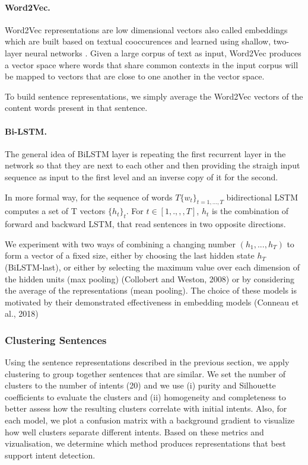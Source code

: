 \documentclass[11pt]{article}
\begin{document}
\paragraph{Word2Vec.} Word2Vec representations are low dimensional vectors also called embeddings which are built based on textual
cooccurences and learned using shallow, two-layer neural networks
\cite{Mikolov2013EfficientEO}. Given a large corpus of text as input,
Word2Vec produces a vector space where words that share common
contexts in the input corpus will be mapped to vectors that are close
to one another in the vector space.


To build sentence representations, we simply average the Word2Vec
vectors of the content words present in that sentence.

\paragraph{Bi-LSTM.} The general idea of BiLSTM layer is repeating the first recurrent layer in the network so that they are next to each other and then providing the straigh input sequence as input to the first level and an inverse copy of it for the second.

In more formal way, for the sequence of words $T \{w_{t}\}_{t = 1, ..., T}$ bidirectional LSTM computes a set of T vectors $\{h_{t}\}_{t}$. For $t ∈ [1 ,. ,,, T]$, $h_{t}$ is the combination of forward and backward LSTM, that read sentences in two opposite directions. 

We experiment with two ways of combining a changing number $(h_{1}, ..., h_{T})$ to form a vector of a fixed size, either by choosing the last hidden state $h_{T}$ (BiLSTM-last), or either by selecting the maximum value over each dimension of the hidden units (max pooling) (Collobert and Weston, 2008) or by considering the average of the representations (mean pooling). The choice of these models is motivated by their demonstrated effectiveness in embedding models (Conneau et al., 2018) 


\subsubsection{Clustering Sentences}

Using the sentence representations described in the previous section,
we apply clustering to group together sentences that are similar.  We
set the number of clusters to the number of intents (20) and we use
(i) purity and Silhouette coefficients to evaluate the clusters
 and (ii) homogeneity and completeness to better assess how the
resulting clusters correlate with initial intents. Also, for each
model, we plot a confusion matrix with a background gradient to
visualize how well clusters separate different intents. Based on these
metrics and vizualisation, we determine which method produces
representations that best support intent detection.
\end{document}
